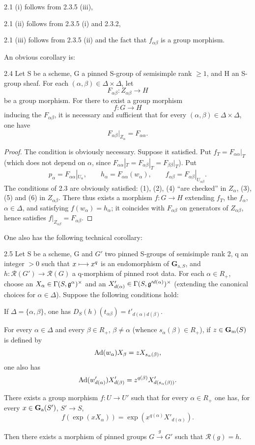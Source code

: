 2.1 (i) follows from 2.3.5 (iii),

2.1 (ii) follows from 2.3.5 (i) and 2.3.2,

2.1 (iii) follows from 2.3.5 (ii) and the fact that $f_{\alpha\beta}$ is a group morphism.

An obvious corollary is:
\begin{corollary}{2.4}\label{XXIII.2.4}
Let S be a scheme, G a pinned S-group of semisimple rank $\geq1$, and H an \fppf S-group sheaf. For each $(\alpha,\beta)\in\Delta\times\Delta$, let
\[
F_{\alpha\beta}:Z_{\alpha\beta}\to H
\]
be a group morphism. For there to exist a group morphism
\[
f:G\to H
\]
inducing the $F_{\alpha\beta}$, it is necessary and sufficient that for every $(\alpha,\beta)\in\Delta\times\Delta$, one have
\[
F_{\alpha\beta}|_{Z_\alpha}=F_{\alpha\alpha}.
\]
\end{corollary}
\begin{proof}
The condition is obviously necessary. Suppose it satisfied. Put $f_T=F_{\alpha\alpha}|_T$ (which does not depend on $\alpha$, since $F_{\alpha\alpha}|_T=F_{\alpha\beta}|_T=F_{\beta\beta}|_T$). Put
\[
p_\alpha=F_{\alpha\alpha}|_{U_\alpha},\qquad h_\alpha=F_{\alpha\alpha}(w_\alpha),\qquad f_{\alpha\beta}=F_{\alpha\beta}|_{U_{\alpha\beta}}.
\]
The conditions of 2.3 are obviously satisfied: (1), (2), (4) ``are checked'' in $Z_\alpha$, (3), (5) and (6) in $Z_{\alpha\beta}$. There thus exists a morphism $f:G\to H$ extending $f_T$, the $f_\alpha$, $\alpha\in\Delta$, and satisfying $f(w_\alpha)=h_\alpha$; it coincides with $F_{\alpha\beta}$ on generators of $Z_{\alpha\beta}$, hence satisfies $f|_{Z_{\alpha\beta}}=F_{\alpha\beta}$.
\end{proof}
One also has the following technical corollary:
\begin{corollary}{2.5}\label{XXIII.2.5}
Let S be a scheme, G and $G'$ two pinned S-groups of semisimple rank 2, q an integer $>0$ such that $x\longmapsto x^q$ is an endomorphism of $\mathbf G_{\mathrm a,S}$, and $h:\mathscr R(G')\to\mathscr R(G)$ a q-morphism of pinned root data. For each $\alpha\in R_+$, choose an $X_\alpha\in\Gamma(S,\mathfrak g^\alpha)^\times$ and an $X'_{d(\alpha)}\in\Gamma(S,\mathfrak g'^{d(\alpha)})^\times$ (extending the canonical choices for $\alpha\in\Delta$). Suppose the following conditions hold:
\begin{enumeratei}
\item If $\Delta=\{\alpha,\beta\}$, one has $D_S(h)(t_{\alpha\beta})=t'_{d(\alpha)d(\beta)}$.
\item For every $\alpha\in\Delta$ and every $\beta\in R_+$, $\beta\ne\alpha$ (whence $s_\alpha(\beta)\in R_+$), if $z\in\mathbf{G}_{\mathrm{m}}(S)$ is defined by
\[
\operatorname{Ad}(w_\alpha)X_\beta=zX_{s_\alpha(\beta)},
\]
one also has
\[
\operatorname{Ad}(w'_{d(\alpha)})X'_{d(\beta)}=z^{q(\beta)}X'_{d(s_\alpha(\beta))}.
\]
\item There exists a group morphism $f:U\to U'$ such that for every $\alpha\in R_+$ one has, for every $x\in\mathbf{G}_{\mathrm{a}}(S')$, $S'\to S$,
\[
f(\exp(xX_\alpha))=\exp(x^{q(\alpha)}X'_{d(\alpha)}).
\]
\end{enumeratei}
Then there exists a morphism of pinned groups $G\xrightarrow{g}G'$ such that $\mathscr R(g)=h$.
\end{corollary}
